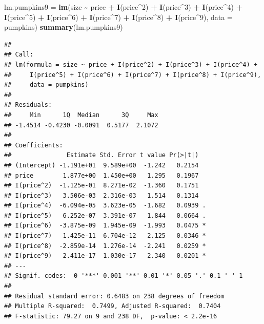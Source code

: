 \documentclass[
]{book}
\newenvironment{Shaded}{\begin{snugshade}}{\end{snugshade}}
\newcommand{\AttributeTok}[1]{\textcolor[rgb]{0.13,0.29,0.53}{#1}}
\newcommand{\DecValTok}[1]{\textcolor[rgb]{0.00,0.00,0.81}{#1}}
\newcommand{\FunctionTok}[1]{\textcolor[rgb]{0.13,0.29,0.53}{\textbf{#1}}}
\newcommand{\NormalTok}[1]{#1}
\newcommand{\OtherTok}[1]{\textcolor[rgb]{0.56,0.35,0.01}{#1}}
\newcommand{\SpecialCharTok}[1]{\textcolor[rgb]{0.81,0.36,0.00}{\textbf{#1}}}
\begin{document}
\begin{Shaded}
\begin{Highlighting}[]
\NormalTok{lm.pumpkins9 }\OtherTok{=} \FunctionTok{lm}\NormalTok{(size }\SpecialCharTok{\textasciitilde{}}\NormalTok{ price }\SpecialCharTok{+} \FunctionTok{I}\NormalTok{(price}\SpecialCharTok{\^{}}\DecValTok{2}\NormalTok{) }\SpecialCharTok{+} \FunctionTok{I}\NormalTok{(price}\SpecialCharTok{\^{}}\DecValTok{3}\NormalTok{) }\SpecialCharTok{+} \FunctionTok{I}\NormalTok{(price}\SpecialCharTok{\^{}}\DecValTok{4}\NormalTok{) }\SpecialCharTok{+}
    \FunctionTok{I}\NormalTok{(price}\SpecialCharTok{\^{}}\DecValTok{5}\NormalTok{) }\SpecialCharTok{+} \FunctionTok{I}\NormalTok{(price}\SpecialCharTok{\^{}}\DecValTok{6}\NormalTok{) }\SpecialCharTok{+} \FunctionTok{I}\NormalTok{(price}\SpecialCharTok{\^{}}\DecValTok{7}\NormalTok{) }\SpecialCharTok{+} \FunctionTok{I}\NormalTok{(price}\SpecialCharTok{\^{}}\DecValTok{8}\NormalTok{) }\SpecialCharTok{+} \FunctionTok{I}\NormalTok{(price}\SpecialCharTok{\^{}}\DecValTok{9}\NormalTok{),}
    \AttributeTok{data =}\NormalTok{ pumpkins)}
\FunctionTok{summary}\NormalTok{(lm.pumpkins9)}
\end{Highlighting}
\end{Shaded}

\begin{verbatim}
## 
## Call:
## lm(formula = size ~ price + I(price^2) + I(price^3) + I(price^4) + 
##     I(price^5) + I(price^6) + I(price^7) + I(price^8) + I(price^9), 
##     data = pumpkins)
## 
## Residuals:
##     Min      1Q  Median      3Q     Max 
## -1.4514 -0.4230 -0.0091  0.5177  2.1072 
## 
## Coefficients:
##               Estimate Std. Error t value Pr(>|t|)  
## (Intercept) -1.191e+01  9.589e+00  -1.242   0.2154  
## price        1.877e+00  1.450e+00   1.295   0.1967  
## I(price^2)  -1.125e-01  8.271e-02  -1.360   0.1751  
## I(price^3)   3.506e-03  2.316e-03   1.514   0.1314  
## I(price^4)  -6.094e-05  3.623e-05  -1.682   0.0939 .
## I(price^5)   6.252e-07  3.391e-07   1.844   0.0664 .
## I(price^6)  -3.875e-09  1.945e-09  -1.993   0.0475 *
## I(price^7)   1.425e-11  6.704e-12   2.125   0.0346 *
## I(price^8)  -2.859e-14  1.276e-14  -2.241   0.0259 *
## I(price^9)   2.411e-17  1.030e-17   2.340   0.0201 *
## ---
## Signif. codes:  0 '***' 0.001 '**' 0.01 '*' 0.05 '.' 0.1 ' ' 1
## 
## Residual standard error: 0.6483 on 238 degrees of freedom
## Multiple R-squared:  0.7499, Adjusted R-squared:  0.7404 
## F-statistic: 79.27 on 9 and 238 DF,  p-value: < 2.2e-16
\end{verbatim}
\end{document}
